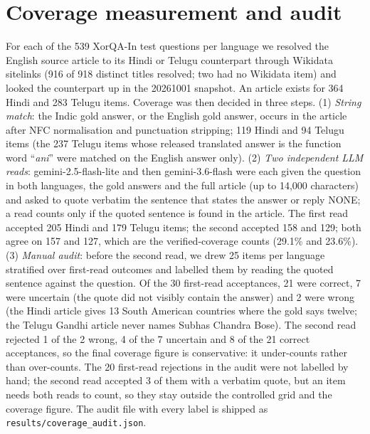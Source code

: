 \section{Coverage measurement and audit}
\label{app:coverage}
For each of the 539 XorQA-In test questions per language we resolved the English source article to its Hindi or Telugu counterpart through Wikidata sitelinks (916 of 918 distinct titles resolved; two had no Wikidata item) and looked the counterpart up in the 20261001 snapshot. An article exists for 364 Hindi and 283 Telugu items. Coverage was then decided in three steps. (1) \emph{String match}: the Indic gold answer, or the English gold answer, occurs in the article after NFC normalisation and punctuation stripping; 119 Hindi and 94 Telugu items (the 237 Telugu items whose released translated answer is the function word ``\emph{ani}'' were matched on the English answer only). (2) \emph{Two independent LLM reads}: gemini-2.5-flash-lite and then gemini-3.6-flash were each given the question in both languages, the gold answers and the full article (up to 14,000 characters) and asked to quote verbatim the sentence that states the answer or reply NONE; a read counts only if the quoted sentence is found in the article. The first read accepted 205 Hindi and 179 Telugu items; the second accepted 158 and 129; both agree on 157 and 127, which are the verified-coverage counts (29.1\% and 23.6\%). (3) \emph{Manual audit}: before the second read, we drew 25 items per language stratified over first-read outcomes and labelled them by reading the quoted sentence against the question. Of the 30 first-read acceptances, 21 were correct, 7 were uncertain (the quote did not visibly contain the answer) and 2 were wrong (the Hindi article gives 13 South American countries where the gold says twelve; the Telugu Gandhi article never names Subhas Chandra Bose). The second read rejected 1 of the 2 wrong, 4 of the 7 uncertain and 8 of the 21 correct acceptances, so the final coverage figure is conservative: it under-counts rather than over-counts. The 20 first-read rejections in the audit were not labelled by hand; the second read accepted 3 of them with a verbatim quote, but an item needs both reads to count, so they stay outside the controlled grid and the coverage figure. The audit file with every label is shipped as \texttt{results/coverage\_audit.json}.
